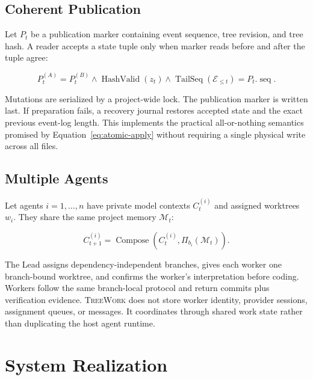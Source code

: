\documentclass[11pt]{article}
\newcommand{\system}{\textsc{TreeWork}\xspace}
\newcommand{\M}{\mathcal{M}}
\newcommand{\E}{\mathcal{E}}
\theoremstyle{definition}
\begin{document}
\subsection{Coherent Publication}

Let $P_t$ be a publication marker containing event sequence, tree revision, and
tree hash.  A reader accepts a state tuple only when marker reads before and
after the tuple agree:

\begin{equation}
  P_t^{(A)}=P_t^{(B)}
  \land
  \operatorname{HashValid}(z_t)
  \land
  \operatorname{TailSeq}(\E_{\le t})=P_t.\operatorname{seq}.
  \label{eq:coherent-read}
\end{equation}

Mutations are serialized by a project-wide lock.  The publication marker is
written last.  If preparation fails, a recovery journal restores accepted
state and the exact previous event-log length.  This implements the practical
all-or-nothing semantics promised by Equation~\ref{eq:atomic-apply} without
requiring a single physical write across all files.

\subsection{Multiple Agents}

Let agents $i=1,\ldots,n$ have private model contexts $C_t^{(i)}$ and assigned
worktrees $w_i$.  They share the same project memory $\M_t$:

\begin{equation}
  C_{t+1}^{(i)}
  =
  \operatorname{Compose}\!\left(
    C_t^{(i)},\Pi_{b_i}(\M_t)
  \right).
  \label{eq:multi-agent-context}
\end{equation}

The Lead assigns dependency-independent branches, gives each worker one
branch-bound worktree, and confirms the worker's interpretation before coding.
Workers follow the same branch-local protocol and return commits plus
verification evidence.  \system does not store worker identity, provider
sessions, assignment queues, or messages.  It coordinates through shared work
state rather than duplicating the host agent runtime.



\section{System Realization}
\label{sec:implementation}
\end{document}

